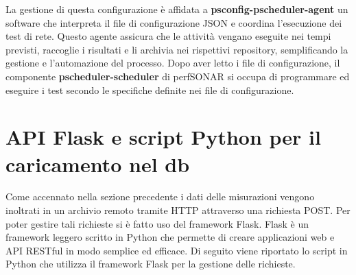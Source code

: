 \documentclass[12pt,a4paper]{report}
\begin{document}
La gestione di questa configurazione è affidata a  {\textbf{psconfig-pscheduler-agent}} un software che interpreta il file di configurazione JSON e coordina l'esecuzione dei test di rete. Questo agente assicura che le attività vengano eseguite nei tempi previsti, raccoglie i risultati e li archivia nei rispettivi repository, semplificando la gestione e l'automazione del processo. Dopo aver letto i file di configurazione, il componente \textbf{pscheduler-scheduler} di perfSONAR si occupa di programmare ed eseguire i test secondo le specifiche definite nei file di configurazione.




\section{API Flask e script Python per il caricamento nel db}

Come accennato nella sezione precedente i dati delle misurazioni vengono inoltrati in un archivio remoto tramite HTTP attraverso una richiesta POST. Per poter gestire tali richieste si è fatto uso del framework Flask.
Flask è un framework leggero scritto in Python che permette di creare applicazioni web e API RESTful in modo semplice ed efficace.
Di seguito viene riportato lo script in Python che utilizza il framework Flask per la gestione delle richieste.
\end{document}
